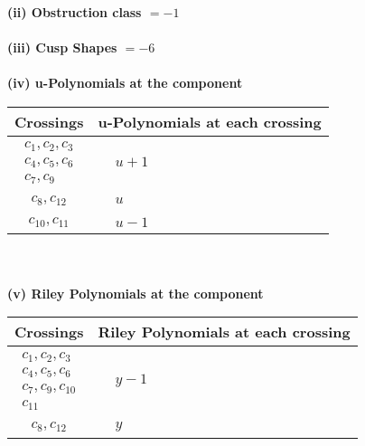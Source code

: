 \documentclass[1p]{elsarticle_modified}
\theoremstyle{definition}
\begin{document}
\flushleft \textbf{(ii) Obstruction class $= -1$}\\~\\
\flushleft \textbf{(iii) Cusp Shapes $= -6$}\\~\\
\newpage\renewcommand{\arraystretch}{1}
\flushleft \textbf{(iv) u-Polynomials at the component}\newline \\
\begin{tabular}{m{50pt}|m{274pt}}
Crossings & \hspace{64pt}u-Polynomials at each crossing \\
\hline $$\begin{aligned}c_{1},c_{2},c_{3}\\c_{4},c_{5},c_{6}\\c_{7},c_{9}\end{aligned}$$&$\begin{aligned}
&u+1
\end{aligned}$\\
\hline $$\begin{aligned}c_{8},c_{12}\end{aligned}$$&$\begin{aligned}
&u
\end{aligned}$\\
\hline $$\begin{aligned}c_{10},c_{11}\end{aligned}$$&$\begin{aligned}
&u-1
\end{aligned}$\\
\hline
\end{tabular}\\~\\
\newpage\renewcommand{\arraystretch}{1}
\flushleft \textbf{(v) Riley Polynomials at the component}\newline \\
\begin{tabular}{m{50pt}|m{274pt}}
Crossings & \hspace{64pt}Riley Polynomials at each crossing \\
\hline $$\begin{aligned}c_{1},c_{2},c_{3}\\c_{4},c_{5},c_{6}\\c_{7},c_{9},c_{10}\\c_{11}\end{aligned}$$&$\begin{aligned}
&y-1
\end{aligned}$\\
\hline $$\begin{aligned}c_{8},c_{12}\end{aligned}$$&$\begin{aligned}
&y
\end{aligned}$\\
\hline
\end{tabular}\\~\\
\end{document}
